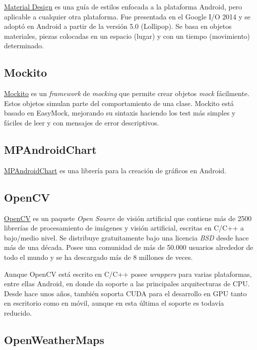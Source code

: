 \href{https://material.io/guidelines/}{Material Design} es una guía de
estilos enfocada a la plataforma Android, pero aplicable a cualquier
otra plataforma. Fue presentada en el Google I/O 2014 y se adoptó en
Android a partir de la versión 5.0 (Lollipop). Se basa en objetos
materiales, piezas colocadas en un espacio (lugar) y con un tiempo
(movimiento) determinado.

\subsection{Mockito}\label{mockito}

\href{http://mockito.org/}{Mockito} es un \emph{framework} de
\emph{mocking} que permite crear objetos \emph{mock} fácilmente. Estos
objetos simulan parte del comportamiento de una clase. Mockito está
basado en EasyMock, mejorando su sintaxis haciendo los test más simples
y fáciles de leer y con mensajes de error descriptivos.

\subsection{MPAndroidChart}\label{mpandroidchart}

\href{https://github.com/PhilJay/MPAndroidChart}{MPAndroidChart} es una
librería para la creación de gráficos en Android.

\subsection{OpenCV}\label{opencv}

\href{www.opencv.org}{OpenCV} es un paquete \emph{Open Source} de visión
artificial que contiene más de 2500 librerías de procesamiento de
imágenes y visión artificial, escritas en C/C++ a bajo/medio nivel. Se
distribuye gratuitamente bajo una licencia \emph{BSD} desde hace más de
una década. Posee una comunidad de más de 50.000 usuarios alrededor de
todo el mundo y se ha descargado más de 8 millones de veces.

Aunque OpenCV está escrito en C/C++ posee \emph{wrappers} para varias
plataformas, entre ellas Android, en donde da soporte a las principales
arquitecturas de CPU. Desde hace unos años, también soporta CUDA para el
desarrollo en GPU tanto en escritorio como en móvil, aunque en esta
última el soporte es todavía reducido.

\subsection{OpenWeatherMaps}\label{openweathermaps}

